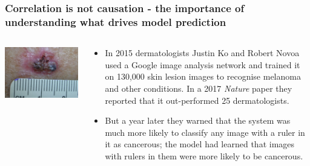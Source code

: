 \begin{frame}
\frametitle{Correlation is not causation - the importance of understanding what drives model prediction}
\begin{columns}
    \begin{column}{0.3\textwidth}
        \includegraphics[width=1\textwidth]{./misc_images/skin_cancer.png}
    \end{column}
    \begin{column}{0.67\textwidth}
    \begin{itemize}
    \item In 2015 dermatologists Justin Ko and Robert Novoa used a Google image analysis network and trained it on 130,000 skin lesion images to recognise melanoma and other conditions. In a 2017 \emph{Nature} paper they reported that it out-performed 25 dermatologists.
        
    \item But a year later they warned that the system was much more likely to classify any image with a ruler in it as cancerous; the model had learned that images with rulers in them were more likely to be cancerous.
    \end{itemize}
    \end{column}
\end{columns}
\end{frame}